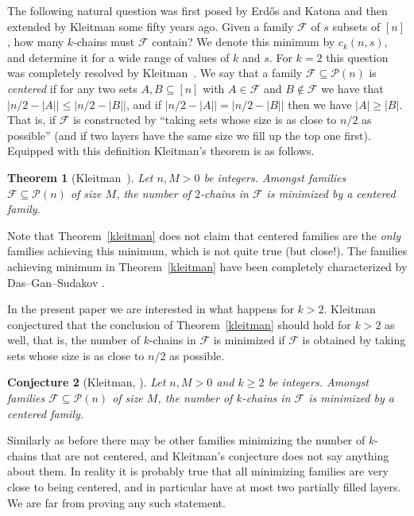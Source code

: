 \documentclass[12pt]{article}
\newtheorem{theorem}{Theorem}[section]
\newtheorem{conj}[theorem]{Conjecture}
\numberwithin{equation}{section}
\def\F{\mathcal{F}}
\def\P{\mathcal{P}}
\begin{document}
The following natural question was first posed by Erd\H{o}s and Katona and then extended by Kleitman some fifty years ago. Given a family $\F$ of $s$ subsets of $[n]$, how many $k$-chains must $\F$ contain? We denote this minimum by $c_k(n, s)$, and determine it for a wide range of values of $k$ and $s$. For $k=2$ this question was completely resolved by Kleitman~\cite{kleitmanpairs}. We say that a family $\F\subseteq \P(n)$ is \emph{centered} if  for any two sets $A,B\subseteq [n]$ with $A\in \F$ and $B\notin \F$ we have that $|n/2-|A||\leq|n/2-|B||$, and if $|n/2-|A||=|n/2-|B||$ then we have $|A|\geq |B|$. That is, if $\F$ is constructed by ``taking sets whose size is as close to $n/2$ as possible'' (and if two layers have the same size we fill up the top one first).  Equipped with this definition Kleitman's theorem is as follows.
\begin{theorem}[\label{kleitman}Kleitman~\cite{kleitmanpairs}]
Let $n,M>0$ be integers. Amongst families $\F\subseteq \P(n)$ of size $M$, the number of $2$-chains in $\F$ is minimized by a centered family.
\end{theorem}
Note that Theorem~\ref{kleitman} does not claim that centered families are the \emph{only} families achieving this minimum, which is not quite true (but close!). The families achieving minimum in Theorem~\ref{kleitman} have been completely characterized by Das--Gan--Sudakov \cite{dasgansuda}.

In the present paper we are interested in what happens for $k>2$. Kleitman conjectured that the conclusion of Theorem~\ref{kleitman} should hold for $k>2$ as well, that is, the number of $k$-chains in $\F$ is minimized if $\F$ is obtained by taking sets whose size is as close to $n/2$ as possible.

\begin{conj}[Kleitman, \cite{kleitmanconj1,kleitmanpairs}]\label{kleitmanconjecture}
Let $n,M>0$ and $k\geq 2$ be integers. Amongst families $\F\subseteq \P(n)$ of size $M$, the number of $k$-chains in $\F$ is minimized by a centered family.
\end{conj}

Similarly as before there may be other families minimizing the number of $k$-chains that are not centered, and Kleitman's conjecture does not say anything about them. In reality it is probably true that all minimizing families are very close to being centered, and in particular have at most two partially filled layers. We are  far from proving any such statement. 
\end{document}
